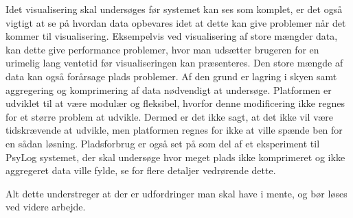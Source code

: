 Idet visualisering skal undersøges før systemet kan ses som komplet, er det også vigtigt at se på hvordan data opbevares idet at dette kan give problemer når det kommer til visualisering. 
Eksempelvis ved visualisering af store mængder data, kan dette give performance problemer, hvor man udsætter brugeren for en urimelig lang ventetid før visualiseringen kan præsenteres. 
Den store mængde af data kan også forårsage plads problemer. 
Af den grund er lagring i skyen samt aggregering og komprimering af data nødvendigt at undersøge.
Platformen er udviklet til at være modulær og fleksibel, hvorfor denne modificering ikke regnes for et større problem at udvikle.
Dermed er det ikke sagt, at det ikke vil være tidskrævende at udvikle, men platformen regnes for ikke at ville spænde ben for en sådan løsning.
Pladsforbrug er også set på som del af et eksperiment til PsyLog systemet, der skal undersøge hvor meget plads ikke komprimeret og ikke aggregeret data ville fylde, se \citet[Kapitel 3, Sektion 4]{misc:faellesrapp} for flere detaljer vedrørende dette.

Alt dette understreger at der er udfordringer man skal have i mente, og bør løses ved videre arbejde.